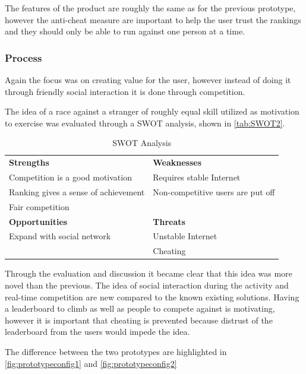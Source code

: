 The features of the product are roughly the same as for the previous prototype, however the anti-cheat measure are important to help the user trust the rankings and they should only be able to run against one person at a time.

\subsubsection{Process}
Again the focus was on creating value for the user, however instead of doing it through friendly social interaction it is done through competition. 

The idea of a race against a stranger of roughly equal skill utilized as motivation to exercise was evaluated through a \ac{SWOT} analysis, shown in \autoref{tab:SWOT2}.

\begin{table}[!ht]
	\begin{tabular}{| l | l |}
		\hline
		\textbf{Strengths} & \textbf{Weaknesses} \\ 
		Competition is a good motivation & Requires stable Internet \\ 
		Ranking gives a sense of achievement & Non-competitive users are put off \\
		Fair competition & \\ \hline
		\textbf{Opportunities} & \textbf{Threats} \\ 
		Expand with social network & Unstable Internet \\
		& Cheating \\
		\hline
	\end{tabular}
	\caption{SWOT Analysis}
	\label{tab:SWOT2}
\end{table}

Through the evaluation and discussion it became clear that this idea was more novel than the previous. The idea of social interaction during the activity and real-time competition are new compared to the known existing solutions. Having a leaderboard to climb as well as people to compete against is motivating, however it is important that cheating is prevented because distrust of the leaderboard from the users would impede the idea.

The difference between the two prototypes are highlighted in \autoref{fig:prototypeconfig1} and \autoref{fig:prototypeconfig2}

